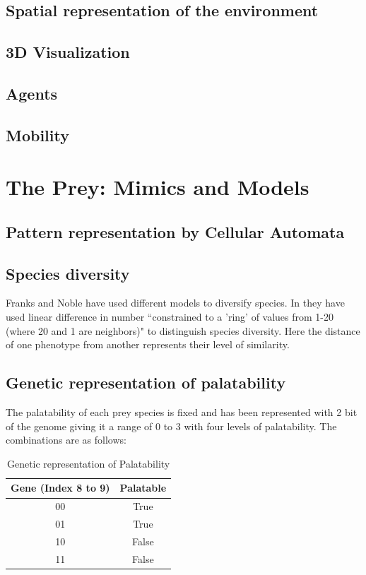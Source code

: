 \subsection{Spatial representation of the environment}

\subsection{3D Visualization}

\subsection{Agents}

\subsection{Mobility}

\section{The Prey: Mimics and Models}

\subsection{Pattern representation by Cellular Automata}

\subsection{Species diversity}
Franks and Noble have used different models to diversify species. In \cite{franks2002} they have used linear difference in number ``constrained to a 'ring' of values  from 1-20 (where 20 and 1 are neighbors)" to distinguish species diversity. Here the distance of one phenotype from another represents their level of similarity. 

\subsection{Genetic representation of palatability}
The palatability of each prey species is fixed and has been represented with 2 bit of the genome giving it a range of 0 to 3 with four levels of palatability. The combinations are as follows:

\begin{table}[H]
	\centering
	\begin{tabular}{|c|c|}
		\hline
			Gene (Index 8 to 9) &	Palatable \\ \hline
			00									& True 			\\ \hline
			01									& True 			\\ \hline
			10									& False 		\\ \hline
			11									& False 		\\
		\hline
	\end{tabular}
	\caption{Genetic representation of Palatability}
	\label{tab:genetic-representation-palatability}
\end{table}

